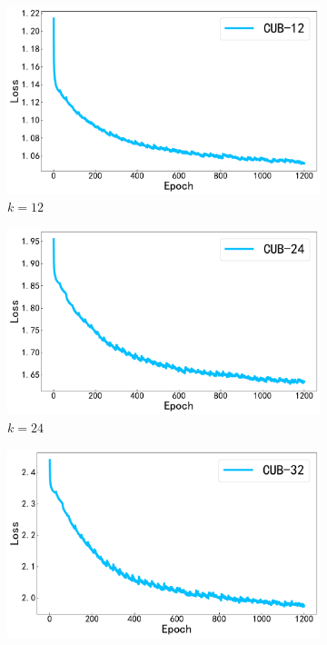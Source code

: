 \begin{figure}[h]
  \centering
  \begin{subfigure}{0.48\textwidth}
    \centering
    \includegraphics[width=\linewidth]{./Img/CUB-12.pdf}
    \caption{$k=12$}\label{fig:4-24}
  \end{subfigure}
  \hfil
  \begin{subfigure}{0.48\textwidth}
    \centering
    \includegraphics[width=\linewidth]{./Img/CUB-24.pdf}
    \caption{$k=24$}\label{fig:4-25}
  \end{subfigure}
  \hfill
  \begin{subfigure}{0.48\textwidth}
    \centering
    \includegraphics[width=\linewidth]{./Img/CUB-32.pdf}

\end{subfigure}
\end{figure}
